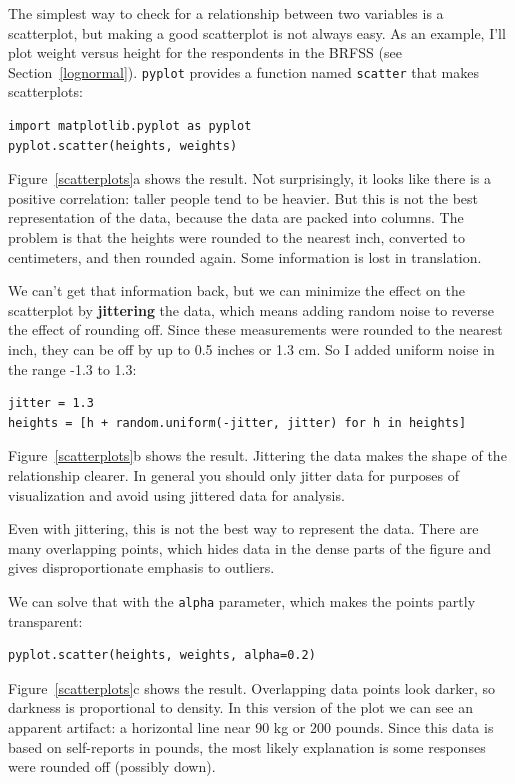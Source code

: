 \documentclass[12pt]{book}
\begin{document}

The simplest way to check for a relationship between two variables
is a scatterplot, but making a good scatterplot is not always easy.
As an example, I'll plot weight versus height for the respondents
in the BRFSS (see Section~\ref{lognormal}).  {\tt pyplot} provides
a function named {\tt scatter} that makes scatterplots:

\begin{verbatim}
import matplotlib.pyplot as pyplot
pyplot.scatter(heights, weights)
\end{verbatim}

Figure~\ref{scatterplots}a shows the result.  Not surprisingly, it
looks like there is a positive correlation: taller people tend to be
heavier.  But this is not the best representation of the data, because
the data are packed into columns.  The problem is that the heights
were rounded to the nearest inch, converted to centimeters, and
then rounded again.  Some information is lost in translation.


We can't get that information back, but we can minimize the effect on
the scatterplot by {\bf jittering} the data, which means adding random
noise to reverse the effect of rounding off.  Since these measurements
were rounded to the nearest inch, they can be off by up to 0.5 inches or
1.3 cm.  So I added uniform noise in the range -1.3 to 1.3:


\begin{verbatim}
jitter = 1.3
heights = [h + random.uniform(-jitter, jitter) for h in heights]
\end{verbatim}

Figure~\ref{scatterplots}b shows the result.  Jittering the data makes
the shape of the relationship clearer.  In general you should only jitter
data for purposes of visualization and avoid using jittered data
for analysis.

Even with jittering, this is not the best way to represent the data.
There are many overlapping points, which hides data
in the dense parts of the figure and gives disproportionate emphasis
to outliers.


We can solve that with the {\tt alpha} parameter, which makes
the points partly transparent:
%
\begin{verbatim}
pyplot.scatter(heights, weights, alpha=0.2)
\end{verbatim}
%
Figure~\ref{scatterplots}c shows the result.  Overlapping data
points look darker, so darkness is proportional to density.  In this
version of the plot we can see an apparent artifact: a horizontal line
near 90 kg or 200 pounds.  Since this data is based on self-reports in
pounds, the most likely explanation is some responses were rounded off
(possibly down).
\end{document}
